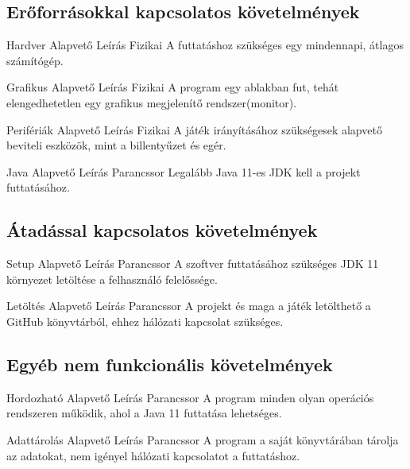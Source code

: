 \subsection{Erőforrásokkal kapcsolatos követelmények}
\begin{kovetelmeny}
	{Hardver} %
	{Alapvető} %
	{Leírás} %
	{Fizikai} %
	{A futtatáshoz szükséges egy mindennapi, átlagos számítógép.} %
\end{kovetelmeny}
\begin{kovetelmeny}
	{Grafikus} %
	{Alapvető} %
	{Leírás} %
	{Fizikai} %
	{A program egy ablakban fut, tehát elengedhetetlen egy grafikus megjelenítő rendszer(monitor).} %
\end{kovetelmeny}
\begin{kovetelmeny}
	{Perifériák} %
	{Alapvető} %
	{Leírás} %
	{Fizikai} %
	{A játék irányításához szükségesek alapvető beviteli eszközök, mint a billentyűzet és egér.} %
\end{kovetelmeny}
\begin{kovetelmeny}
	{Java} %
	{Alapvető} %
	{Leírás} %
	{Parancssor} %
	{Legalább Java 11-es JDK kell a projekt futtatásához.} %
\end{kovetelmeny}

\subsection{Átadással kapcsolatos követelmények}
\begin{kovetelmeny}
    {Setup} %
    {Alapvető} %
    {Leírás} %
    {Parancssor} %
    {A szoftver futtatásához szükséges JDK 11 környezet letöltése a felhasználó felelőssége.} %
\end{kovetelmeny}
\begin{kovetelmeny}
    {Letöltés} %
    {Alapvető} %
    {Leírás} %
    {Parancssor} %
    {A projekt és maga a játék letölthető a GitHub könyvtárból, ehhez hálózati kapcsolat szükséges.} %
\end{kovetelmeny}

\subsection{Egyéb nem funkcionális követelmények}
\begin{kovetelmeny}
    {Hordozható} %
    {Alapvető} %
    {Leírás} %
    {Parancssor} %
    {A program minden olyan operációs rendszeren működik, ahol a Java 11 futtatása lehetséges.} %
\end{kovetelmeny}
\begin{kovetelmeny}
    {Adattárolás} %
    {Alapvető} %
    {Leírás} %
    {Parancssor} %
    {A program a saját könyvtárában tárolja az adatokat, nem igényel hálózati kapcsolatot a futtatáshoz.} %
\end{kovetelmeny}


